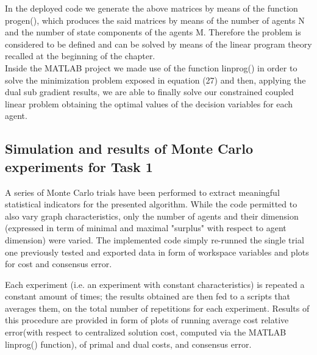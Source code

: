 \documentclass{article}
\begin{document}
\noindent In the deployed code we generate the above matrices by means of the function progen(), which produces the said matrices by means of the number of agents N and the number of state components of the agents M. Therefore the problem is considered to be defined and can be solved by means of the linear program theory recalled at the beginning of the chapter.\\
Inside the MATLAB project we made use of the function linprog() in order to solve the minimization problem exposed in equation (27) and then, applying the dual sub gradient results, we are able to finally solve our constrained  coupled  linear  problem obtaining the optimal values of the decision variables for each agent.

\subsection {Simulation and results of Monte Carlo experiments for Task 1}
A series of Monte Carlo trials have been performed to extract meaningful statistical indicators for the presented algorithm. While the code permitted to also vary graph characteristics, only the number of agents and their dimension (expressed in term of minimal and maximal "surplus" with respect to agent dimension) were varied.
The implemented code simply re-runned the single trial one previously tested and exported data in form of workspace variables and plots for cost and consensus error.

Each experiment (i.e. an experiment with constant characteristics) is repeated a constant amount of times; the results obtained are then fed to a scripts that averages them, on the total number of repetitions for each experiment. Results of this procedure are provided in form of plots of running average cost  relative error(with respect to centralized solution cost, computed via the MATLAB linprog() function), of primal and dual costs, and consensus error.\\
\end{document}
